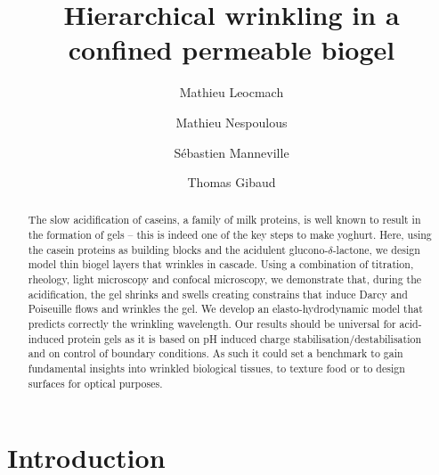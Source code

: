 \documentclass[twocolumn,superscriptaddress,showpacs,preprintnumbers,
amsmath,amssymb,prl]{revtex4-1}
\begin{document}
\title{Hierarchical wrinkling in a confined permeable biogel}
\author{Mathieu Leocmach}
\author{Mathieu Nespoulous}
\author{Sébastien Manneville}
\author{Thomas Gibaud}

\begin{abstract}
The slow acidification of caseins, a family of milk proteins, is well known to result in the formation of gels -- this is indeed one of the key steps to make yoghurt. Here, using the casein proteins as  building blocks and the acidulent glucono-$\delta$-lactone, we design model thin biogel layers that wrinkles in cascade. Using a combination of titration, rheology, light microscopy and confocal microscopy, we demonstrate that, during the acidification, the gel shrinks and swells creating constrains that induce Darcy and Poiseuille flows and wrinkles the gel. We develop an elasto-hydrodynamic model that predicts correctly the wrinkling wavelength. Our results should be universal for acid-induced protein gels as it is based on pH induced charge stabilisation/destabilisation and on control of boundary conditions. As such it could set a benchmark to gain fundamental insights into wrinkled biological tissues, to texture food or to design surfaces for optical purposes.
\end{abstract}

\maketitle

\section*{Introduction}
\end{document}
